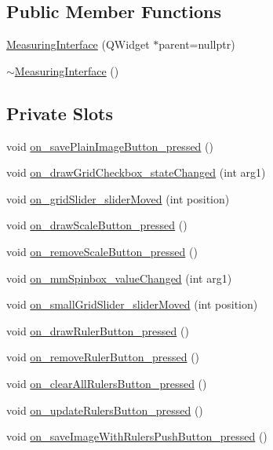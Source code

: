 \subsection*{Public Member Functions}
\begin{DoxyCompactItemize}
\item 
\mbox{\hyperlink{classMeasuringInterface_ad1093726e69352028a38b18a5294a6ac}{Measuring\+Interface}} (Q\+Widget $\ast$parent=nullptr)
\item 
\mbox{\hyperlink{classMeasuringInterface_ac2538499814171168011c4e26731a084}{$\sim$\+Measuring\+Interface}} ()
\end{DoxyCompactItemize}
\subsection*{Private Slots}
\begin{DoxyCompactItemize}
\item 
void \mbox{\hyperlink{classMeasuringInterface_abbb97e89e646574ba20297556e666cc7}{on\+\_\+save\+Plain\+Image\+Button\+\_\+pressed}} ()
\item 
void \mbox{\hyperlink{classMeasuringInterface_a37da2b051cdaef7769ac1f1f8a849753}{on\+\_\+draw\+Grid\+Checkbox\+\_\+state\+Changed}} (int arg1)
\item 
void \mbox{\hyperlink{classMeasuringInterface_a5f9322ce550b248eeac9cf9cd35b6400}{on\+\_\+grid\+Slider\+\_\+slider\+Moved}} (int position)
\item 
void \mbox{\hyperlink{classMeasuringInterface_a310c3915895175fe1dc14d9234095de0}{on\+\_\+draw\+Scale\+Button\+\_\+pressed}} ()
\item 
void \mbox{\hyperlink{classMeasuringInterface_ac406b351a7162743198aa64bbc2a9c46}{on\+\_\+remove\+Scale\+Button\+\_\+pressed}} ()
\item 
void \mbox{\hyperlink{classMeasuringInterface_ac94cdc4a4e60d0910c499b5ed496790a}{on\+\_\+mm\+Spinbox\+\_\+value\+Changed}} (int arg1)
\item 
void \mbox{\hyperlink{classMeasuringInterface_af76bfc58f5f4a96c860d64dd0b650e5e}{on\+\_\+small\+Grid\+Slider\+\_\+slider\+Moved}} (int position)
\item 
void \mbox{\hyperlink{classMeasuringInterface_a997fecc781bfc253f672a84a201ea846}{on\+\_\+draw\+Ruler\+Button\+\_\+pressed}} ()
\item 
void \mbox{\hyperlink{classMeasuringInterface_a23015fd17f84f8b656cbf4e352b02604}{on\+\_\+remove\+Ruler\+Button\+\_\+pressed}} ()
\item 
void \mbox{\hyperlink{classMeasuringInterface_a423a52e80d530b4cf1154422b3de5073}{on\+\_\+clear\+All\+Rulers\+Button\+\_\+pressed}} ()
\item 
void \mbox{\hyperlink{classMeasuringInterface_a18a63bf732f8df1ed9b94450b19ef455}{on\+\_\+update\+Rulers\+Button\+\_\+pressed}} ()
\item 
void \mbox{\hyperlink{classMeasuringInterface_a87fcf4623df1c9af6663fe236bb3dd0e}{on\+\_\+save\+Image\+With\+Rulers\+Push\+Button\+\_\+pressed}} ()
\end{DoxyCompactItemize}
